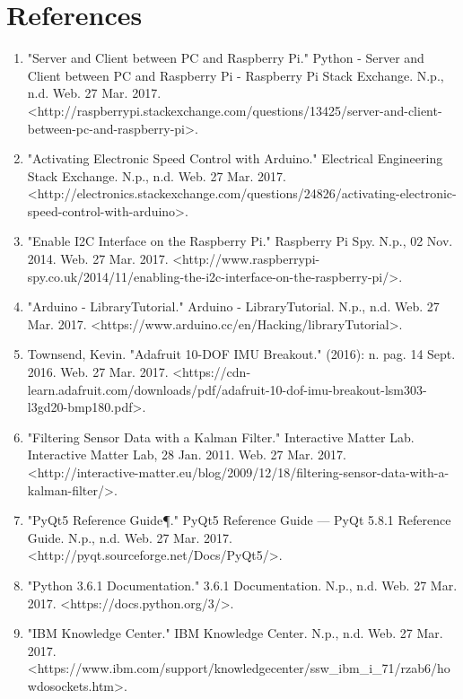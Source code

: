 \section{References}

\begin{enumerate}

\item "Server and Client between PC and Raspberry Pi." Python - Server and Client between PC and Raspberry Pi - Raspberry Pi Stack Exchange. N.p., n.d. Web. 27 Mar. 2017. <http://raspberrypi.stackexchange.com/questions/13425/server-and-client-between-pc-and-raspberry-pi>.

 \item "Activating Electronic Speed Control with Arduino." Electrical Engineering Stack Exchange. N.p., n.d. Web. 27 Mar. 2017. <http://electronics.stackexchange.com/questions/24826/activating-electronic-speed-control-with-arduino>.
 
 \item "Enable I2C Interface on the Raspberry Pi." Raspberry Pi Spy. N.p., 02 Nov. 2014. Web. 27 Mar. 2017. <http://www.raspberrypi-spy.co.uk/2014/11/enabling-the-i2c-interface-on-the-raspberry-pi/>.
 
 \item "Arduino - LibraryTutorial." Arduino - LibraryTutorial. N.p., n.d. Web. 27 Mar. 2017. <https://www.arduino.cc/en/Hacking/libraryTutorial>.
 
 \item Townsend, Kevin. "Adafruit 10-DOF IMU Breakout." (2016): n. pag. 14 Sept. 2016. Web. 27 Mar. 2017. <https://cdn-learn.adafruit.com/downloads/pdf/adafruit-10-dof-imu-breakout-lsm303-l3gd20-bmp180.pdf>.
 
 \item "Filtering Sensor Data with a Kalman Filter." Interactive Matter Lab. Interactive Matter Lab, 28 Jan. 2011. Web. 27 Mar. 2017. <http://interactive-matter.eu/blog/2009/12/18/filtering-sensor-data-with-a-kalman-filter/>.
 
 \item "PyQt5 Reference Guide¶." PyQt5 Reference Guide — PyQt 5.8.1 Reference Guide. N.p., n.d. Web. 27 Mar. 2017. <http://pyqt.sourceforge.net/Docs/PyQt5/>.
 
 \item "Python 3.6.1 Documentation." 3.6.1 Documentation. N.p., n.d. Web. 27 Mar. 2017. <https://docs.python.org/3/>.
 
 \item "IBM Knowledge Center." IBM Knowledge Center. N.p., n.d. Web. 27 Mar. 2017. <https://www.ibm.com/support/knowledgecenter/ssw_ibm_i_71/rzab6/howdosockets.htm>.

\end{enumerate}